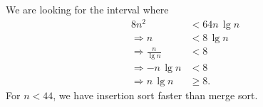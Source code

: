 
We are looking for the interval where
\begin{equation*}
    \begin{aligned}
        8n^2 &< 64n\, \lg{n}\\
        \Rightarrow n &< 8\, \lg{n}\\
        \Rightarrow \frac{n}{\lg{n}} &< 8\\
        \Rightarrow -n \, \lg{n} &< 8\\
        \Rightarrow n \, \lg{n} &\geq 8.
    \end{aligned}
\end{equation*}
For $n < 44$, we have insertion sort faster than merge sort.
